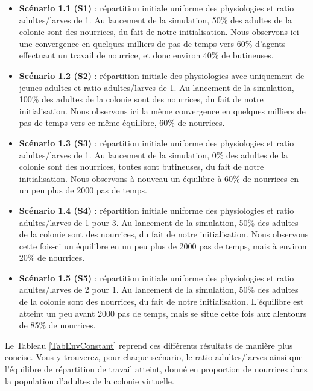 	\begin{itemize}
		\item \textbf{Scénario 1.1 (S1)} : répartition initiale uniforme des physiologies et ratio adultes/larves de 1. Au lancement de la simulation, 50\% des adultes de la colonie sont des nourrices, du fait de notre initialisation. Nous observons ici une convergence en quelques milliers de pas de temps vers 60\% d'agents effectuant un travail de nourrice, et donc environ 40\% de butineuses.
		
		\item \textbf{Scénario 1.2 (S2)} : répartition initiale des physiologies avec uniquement de jeunes adultes et ratio adultes/larves de 1. Au lancement de la simulation, 100\% des adultes de la colonie sont des nourrices, du fait de notre initialisation. Nous observons ici la même convergence en quelques milliers de pas de temps vers ce même équilibre, 60\% de nourrices.
		
		\item \textbf{Scénario 1.3 (S3)} : répartition initiale uniforme des physiologies et ratio adultes/larves de 1. Au lancement de la simulation, 0\% des adultes de la colonie sont des nourrices, toutes sont butineuses, du fait de notre initialisation. Nous observons à nouveau un équilibre à 60\% de nourrices en un peu plus de 2000 pas de temps.
		
		\item \textbf{Scénario 1.4 (S4)} : répartition initiale uniforme des physiologies et ratio adultes/larves de 1 pour 3. Au lancement de la simulation, 50\% des adultes de la colonie sont des nourrices, du fait de notre initialisation. Nous observons cette fois-ci un équilibre en un peu plus de 2000 pas de temps, mais à environ 20\% de nourrices.
		
		\item \textbf{Scénario 1.5 (S5)} : répartition initiale uniforme des physiologies et ratio adultes/larves de 2 pour 1. Au lancement de la simulation, 50\% des adultes de la colonie sont des nourrices, du fait de notre initialisation. L'équilibre est atteint un peu avant 2000 pas de temps, mais se situe cette fois aux alentours de 85\% de nourrices.		
	\end{itemize}
	
	Le Tableau \ref{TabEnvConstant} reprend ces différents résultats de manière plus concise. Vous y trouverez, pour chaque scénario, le ratio adultes/larves ainsi que l'équilibre de répartition de travail atteint, donné en proportion de nourrices dans la population d'adultes de la colonie virtuelle.
	
